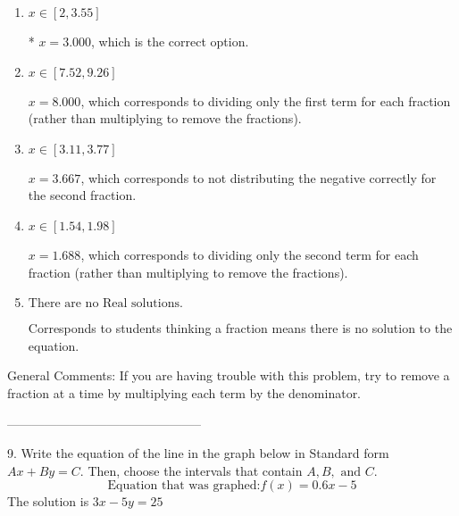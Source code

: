 \documentclass{extbook}[14pt]
\begin{document}
\begin{enumerate}[label=\Alph*.] 
\item $ x \in [2, 3.55] $ 

 * $x = 3.000$, which is the correct option. 
\item $ x \in [7.52, 9.26] $ 

  $x = 8.000$, which corresponds to dividing only the first term for each fraction (rather than multiplying to remove the fractions). 
\item $ x \in [3.11, 3.77] $ 

  $x = 3.667$, which corresponds to not distributing the negative correctly for the second fraction. 
\item $ x \in [1.54, 1.98] $ 

  $x = 1.688$, which corresponds to dividing only the second term for each fraction (rather than multiplying to remove the fractions). 
\item $ \text{There are no Real solutions.} $ 

 Corresponds to students thinking a fraction means there is no solution to the equation. 
\end{enumerate} 
 
General Comments: If you are having trouble with this problem, try to remove a fraction at a time by multiplying each term by the denominator.

-----------------------------------------------

9. Write the equation of the line in the graph below in Standard form $Ax+By=C$. Then, choose the intervals that contain $A, B, \text{ and } C$.
\[ \text{Equation that was graphed:} f(x)= 0.6 x - 5 \] 
The solution is $ 3 x - 5 y = 25 $ 
\end{document}
